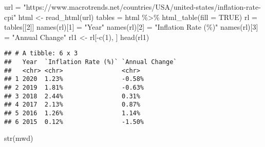 \documentclass[
]{article}
\newenvironment{Shaded}{\begin{snugshade}}{\end{snugshade}}
\newcommand{\AttributeTok}[1]{\textcolor[rgb]{0.77,0.63,0.00}{#1}}
\newcommand{\ConstantTok}[1]{\textcolor[rgb]{0.00,0.00,0.00}{#1}}
\newcommand{\DecValTok}[1]{\textcolor[rgb]{0.00,0.00,0.81}{#1}}
\newcommand{\FunctionTok}[1]{\textcolor[rgb]{0.00,0.00,0.00}{#1}}
\newcommand{\NormalTok}[1]{#1}
\newcommand{\OtherTok}[1]{\textcolor[rgb]{0.56,0.35,0.01}{#1}}
\newcommand{\SpecialCharTok}[1]{\textcolor[rgb]{0.00,0.00,0.00}{#1}}
\newcommand{\StringTok}[1]{\textcolor[rgb]{0.31,0.60,0.02}{#1}}
\begin{document}
\begin{Shaded}
\begin{Highlighting}[]
\NormalTok{url }\OtherTok{=} \StringTok{"https://www.macrotrends.net/countries/USA/united{-}states/inflation{-}rate{-}cpi"}
\NormalTok{html }\OtherTok{\textless{}{-}} \FunctionTok{read\_html}\NormalTok{(url)}
\NormalTok{tables }\OtherTok{=}\NormalTok{ html }\SpecialCharTok{\%\textgreater{}\%} \FunctionTok{html\_table}\NormalTok{(}\AttributeTok{fill =} \ConstantTok{TRUE}\NormalTok{)}
\NormalTok{rl }\OtherTok{=}\NormalTok{ tables[[}\DecValTok{2}\NormalTok{]]}
\FunctionTok{names}\NormalTok{(rl)[}\DecValTok{1}\NormalTok{] }\OtherTok{=} \StringTok{"Year"}
\FunctionTok{names}\NormalTok{(rl)[}\DecValTok{2}\NormalTok{] }\OtherTok{=} \StringTok{"Inflation Rate (\%)"}
\FunctionTok{names}\NormalTok{(rl)[}\DecValTok{3}\NormalTok{] }\OtherTok{=} \StringTok{"Annual Change"}
\NormalTok{rl1 }\OtherTok{\textless{}{-}}\NormalTok{ rl[}\SpecialCharTok{{-}}\FunctionTok{c}\NormalTok{(}\DecValTok{1}\NormalTok{), ]}
\FunctionTok{head}\NormalTok{(rl1)}
\end{Highlighting}
\end{Shaded}

\begin{verbatim}
## # A tibble: 6 x 3
##   Year  `Inflation Rate (%)` `Annual Change`
##   <chr> <chr>                <chr>          
## 1 2020  1.23%                -0.58%         
## 2 2019  1.81%                -0.63%         
## 3 2018  2.44%                0.31%          
## 4 2017  2.13%                0.87%          
## 5 2016  1.26%                1.14%          
## 6 2015  0.12%                -1.50%
\end{verbatim}

\begin{Shaded}
\begin{Highlighting}[]
\FunctionTok{str}\NormalTok{(mwd)}
\end{Highlighting}
\end{Shaded}
\end{document}
